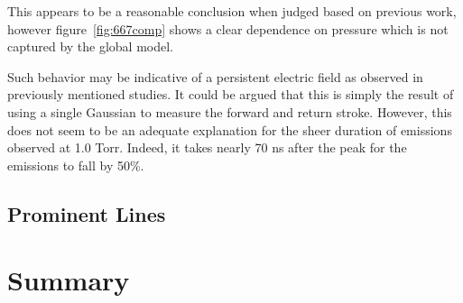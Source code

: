 This appears to be a reasonable conclusion when judged based on previous work,
however figure~\ref{fig:667comp} shows a clear dependence on pressure which is
not captured by the global model.

Such behavior may be indicative of a persistent electric field as observed in
previously mentioned studies. It could be argued that this is simply the
result of using a single Gaussian to measure the forward and return stroke.
However, this does not seem to be an adequate explanation for the sheer duration
of emissions observed at 1.0 Torr. Indeed, it takes nearly 70 ns after the peak
for the emissions to fall by 50\%. 



\subsection{Prominent Lines}

\section{Summary}
